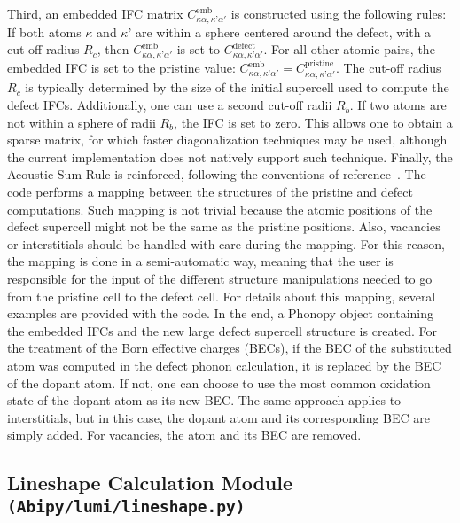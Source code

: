 Third, an embedded IFC matrix $C_{\kappa\alpha,\kappa’\alpha'}^{\mathrm{emb}}$ is constructed using the following rules: If both atoms $\kappa$ and $\kappa’$ are within a sphere centered around the defect, with a cut-off radius $R_c$, then $C_{\kappa\alpha,\kappa’\alpha'}^{\mathrm{emb}}$ is set to $C_{\kappa\alpha,\kappa’\alpha'}^{\mathrm{defect}}$. For all other atomic pairs, the embedded IFC is set to the pristine value: $C_{\kappa\alpha,\kappa’\alpha'}^{\mathrm{emb}} = C_{\kappa\alpha,\kappa’\alpha'}^{\mathrm{pristine}}$. The cut-off radius $R_c$ is typically determined by the size of the initial supercell used to compute the defect IFCs. Additionally, one can use a second cut-off radii $R_b$. If two atoms are not within a sphere of radii $R_b$, the IFC is set to zero. This allows one to obtain a sparse matrix, for which faster diagonalization techniques may be used, although the current implementation does not natively support such technique. Finally, the Acoustic Sum Rule is reinforced, following the conventions of reference~\cite{jin2021photoluminescence}. 
The code performs a mapping between the structures of the pristine and defect computations. Such mapping is not trivial because the atomic positions of the defect supercell might not be the same as the pristine positions. Also, vacancies or interstitials should be handled with care during the mapping. For this reason, the mapping is done in a semi-automatic way, meaning that the user is responsible for the input of the different structure manipulations needed to go from the pristine cell to the defect cell. For details about this mapping, several examples are provided with the code. In the end, a Phonopy object containing the embedded IFCs and the new large defect supercell structure is created. For the treatment of the Born effective charges (BECs), if the BEC of the substituted atom was computed in the defect phonon calculation, it is replaced by the BEC of the dopant atom. If not, one can choose to use the most common oxidation state of the dopant atom as its new BEC. The same approach applies to interstitials, but in this case, the dopant atom and its corresponding BEC are simply added. For vacancies, the atom and its BEC are removed.

\subsection*{Lineshape Calculation Module  \texttt{(Abipy/lumi/lineshape.py)}}

